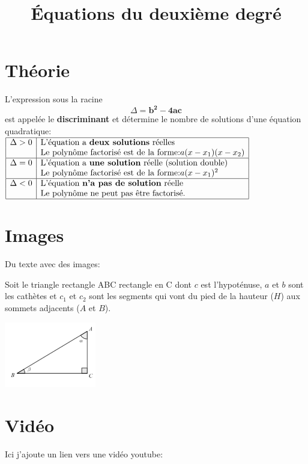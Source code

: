\documentclass[a4paper,11pt]{article}
\begin{document}
\title{Équations du deuxième degré}
\date{}
\maketitle


\section{Théorie}
L'expression sous la racine $$\Delta= \mathbf{b^2-4ac}$$ est appelée le \textbf{discriminant} et détermine le nombre de solutions d'une équation quadratique:\\
$\begin{array}{|l | l |}
\hline
\Delta>0 & \text{L'équation a \textbf{deux solutions} réelles} \\
& \text{Le polynôme factorisé est de la forme:}  a(x - x_{1})(x - x_{2}) \\
\hline
\Delta=0 & \text{L'équation a \textbf{une solution} réelle (solution double)}\\
& \text{Le polynôme factorisé est de la forme:}  a(x - x_{1})^2\\
\hline
\Delta<0 & \text{L'équation \textbf{n'a pas de solution} réelle}\\
& \text{Le polynôme ne peut pas être factorisé.}\\
\hline
\end{array}$\par

\section{Images}
Du texte avec des images:\par
Soit le triangle rectangle ABC rectangle en C dont $c$ est l'hypoténuse, $a$ et $b$ sont les cathètes et $c_{1}$ et $c_{2}$ sont les segments qui vont du pied de la hauteur ($H$) aux sommets adjacents ($A$ et $B$).\par
\includegraphics[width=0.3\textwidth]{images/pythagore.png}\\

\section{Vidéo}
Ici j'ajoute un lien vers une vidéo youtube:\par
{} %
\end{document}
